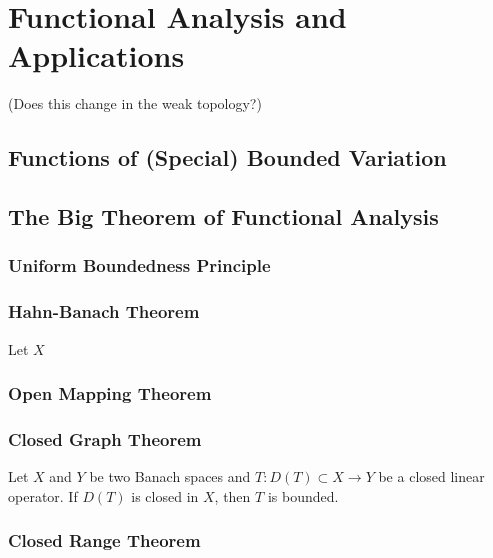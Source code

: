 \chapter{Functional Analysis and Applications}

\begin{remark}
(Does this change in the weak topology?)
\end{remark}

\section{Functions of (Special) Bounded Variation}

\section{The Big Theorem of Functional Analysis}

\subsection{Uniform Boundedness Principle}
\subsection{Hahn-Banach Theorem}

\begin{theorem}
Let $X$
\end{theorem}

\subsection{Open Mapping Theorem}
\subsection{Closed Graph Theorem}

\begin{theorem}
Let $X$ and $Y$ be two Banach spaces and $T: D(T)\subset X \rightarrow Y$
be a closed linear operator. If $D(T)$ is closed in $X$, then $T$ is bounded.
\end{theorem}


\subsection{Closed Range Theorem}

\begin{theorem}
\end{theorem}

